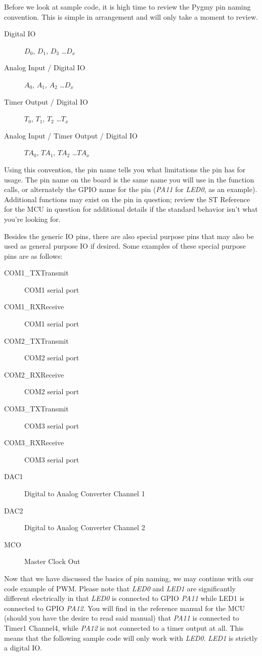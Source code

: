 \documentclass{article}
\begin{document}
Before we look at sample code, it is high time to review the Pygmy pin naming convention. This is simple in arrangement and will only take a moment to review.
\begin{description}
	\item[Digital IO] $D_0$, $D_1$, $D_3$ \ldots $D_x$
	\item[Analog Input / Digital IO] $A_0$, $A_1$, $A_2$ \ldots $D_x$
	\item[Timer Output / Digital IO] $T_0$, $T_1$, $T_2$ \ldots $T_x$
	\item[Analog Input / Timer Output / Digital IO] $TA_0$, $TA_1$, $TA_2$ \ldots $TA_x$
\end{description}

Using this convention, the pin name tells you what limitations the pin has for usage. The pin name on the board is the same name you will use in the function calls, or alternately the \ac{GPIO} name for the pin (\emph{PA11} for \emph{LED0}, as an example). Additional functions may exist on the pin in question; review the ST Reference for the MCU in question for additional details if the standard behavior isn't what you're looking for.

Besides the generic IO pins, there are also special purpose pins that may also be used as general purpose IO if desired. Some examples of these special purpose pins are as follows:
\begin{description}
	\item[COM1\_TXTransmit] COM1 serial port
	\item[COM1\_RXReceive] COM1 serial port
	\item[COM2\_TXTransmit] COM2 serial port
	\item[COM2\_RXReceive]  COM2 serial port
	\item[COM3\_TXTransmit] COM3 serial port
	\item[COM3\_RXReceive] COM3 serial port
	\item[DAC1] Digital to Analog Converter Channel 1
	\item[DAC2] Digital to Analog Converter Channel 2
	\item[MCO] Master Clock Out
\end{description}

Now that we have discussed the basics of pin naming, we may continue with our code example of \ac{PWM}. Please note that \emph{LED0} and \emph{LED1} are significantly different electrically in that \emph{LED0} is connected to \ac{GPIO} \emph{PA11} while LED1 is connected to \ac{GPIO} \emph{PA12}. You will find in the reference manual for the MCU (should you have the desire to read said manual) that \emph{PA11} is connected to Timer1 Channel4, while \emph{PA12} is not connected to a timer output at all. This means that the following sample code will only work with \emph{LED0}. \emph{LED1} is strictly a digital IO.
\end{document}
